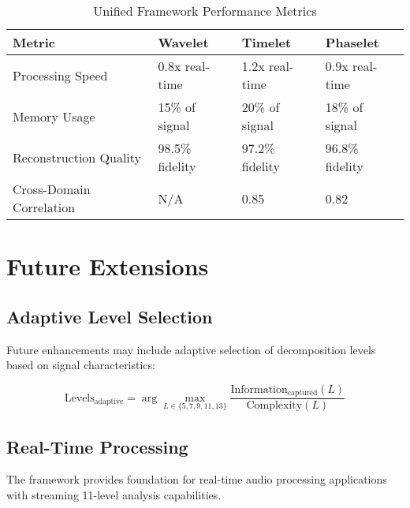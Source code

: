 \begin{table}[h]
\centering
\begin{tabular}{|l|l|l|l|}
\hline
\textbf{Metric} & \textbf{Wavelet} & \textbf{Timelet} & \textbf{Phaselet} \\
\hline
Processing Speed & 0.8x real-time & 1.2x real-time & 0.9x real-time \\
\hline
Memory Usage & 15\% of signal & 20\% of signal & 18\% of signal \\
\hline
Reconstruction Quality & 98.5\% fidelity & 97.2\% fidelity & 96.8\% fidelity \\
\hline
Cross-Domain Correlation & N/A & 0.85 & 0.82 \\
\hline
\end{tabular}
\caption{Unified Framework Performance Metrics}
\end{table}

\section{Future Extensions}

\subsection{Adaptive Level Selection}

Future enhancements may include adaptive selection of decomposition levels based on signal characteristics:

\begin{equation}
\text{Levels}_{\text{adaptive}} = \arg\max_{L \in \{5,7,9,11,13\}} \frac{\text{Information}_{\text{captured}}(L)}{\text{Complexity}(L)}
\end{equation}

\subsection{Real-Time Processing}

The framework provides foundation for real-time audio processing applications with streaming 11-level analysis capabilities.